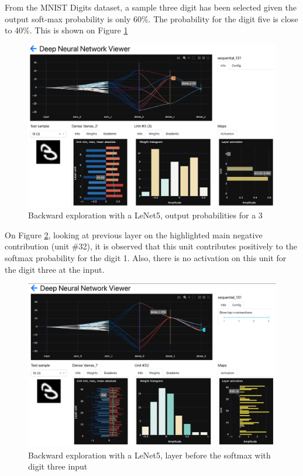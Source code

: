 From the MNIST Digits dataset, a sample three digit has been selected given the output soft-max probability is only 60\%. The probability for the digit five is close to 40\%. This is shown on Figure \ref{fig:dnn-viewer-backward-1}

\begin{figure}[H]
    \centering
    \includegraphics[scale=0.3]{images/dnn-viewer/BackwardThree_1.png}
    \caption{Backward exploration with a LeNet5, output probabilities for a 3}
    \label{fig:dnn-viewer-backward-1}
\end{figure}

On Figure \ref{fig:dnn-viewer-backward-2}, looking at previous layer on the highlighted main negative contribution (unit \#32), it is observed that this unit contributes positively to the softmax probability for the digit 1. Also, there is no activation on this unit for the digit three at the input.

\begin{figure}[H]
    \centering
    \includegraphics[scale=0.3]{images/dnn-viewer/BackwardThree_2.png}
    \caption{Backward exploration with a LeNet5, layer before the softmax with digit three input}
    \label{fig:dnn-viewer-backward-2}
\end{figure}

